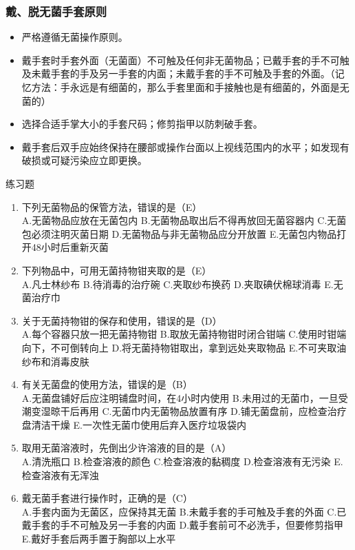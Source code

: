 \documentclass[11pt, a4paper]{ctexart}
\begin{document}
\subsubsection{戴、脱无菌手套原则}
\begin{itemize}
    \item 严格遵循无菌操作原则。
    \item 戴手套时手套外面（无菌面）不可触及任何非无菌物品；已戴手套的手不可触及未戴手套的手及另一手套的内面；未戴手套的手不可触及手套的外面。（记忆方法：手永远是有细菌的，那么手套里面和手接触也是有细菌的，外面是无菌的）
    \item 选择合适手掌大小的手套尺码；修剪指甲以防刺破手套。
    \item 戴手套后双手应始终保持在腰部或操作台面以上视线范围内的水平；如发现有破损或可疑污染应立即更换。
\end{itemize}

\begin{examplebox}{练习题}
\begin{enumerate}
    \item 下列无菌物品的保管方法，错误的是（E）\\
    A.无菌物品应放在无菌包内 \quad B.无菌物品取出后不得再放回无菌容器内 \quad C.无菌包必须注明灭菌日期 \quad D.无菌物品与非无菌物品应分开放置 \quad E.无菌包内物品打开48小时后重新灭菌
    \item 下列物品中，可用无菌持物钳夹取的是（E）\\
    A.凡士林纱布 \quad B.待消毒的治疗碗 \quad C.夹取纱布换药 \quad D.夹取碘伏棉球消毒 \quad E.无菌治疗巾
    \item 关于无菌持物钳的保存和使用，错误的是（D）\\
    A.每个容器只放一把无菌持物钳 \quad B.取放无菌持物钳时闭合钳端 \quad C.使用时钳端向下，不可倒转向上 \quad D.将无菌持物钳取出，拿到远处夹取物品 \quad E.不可夹取油纱布和消毒皮肤
    \item 有关无菌盘的使用方法，错误的是（B）\\
    A.无菌盘铺好后应注明铺盘时间，在4小时内使用 \quad B.未用过的无菌巾，一旦受潮变湿晾干后再用 \quad C.无菌巾内无菌物品放置有序 \quad D.铺无菌盘前，应检查治疗盘清洁干燥 \quad E.一次性无菌巾使用后弃入医疗垃圾袋内
    \item 取用无菌溶液时，先倒出少许溶液的目的是（A）\\
    A.清洗瓶口 \quad B.检查溶液的颜色 \quad C.检查溶液的黏稠度 \quad D.检查溶液有无污染 \quad E.检查溶液有无浑浊
    \item 戴无菌手套进行操作时，正确的是（C）\\
    A.手套内面为无菌区，应保持其无菌 \quad B.未戴手套的手可触及手套的外面 \quad C.已戴手套的手不可触及另一手套的内面 \quad D.戴手套前可不必洗手，但要修剪指甲 \quad E.戴好手套后两手置于胸部以上水平
\end{enumerate}
\end{examplebox}
\end{document}
